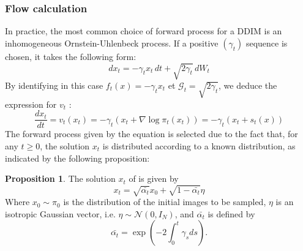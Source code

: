 \documentclass[a4paper,10pt]{article}
\theoremstyle{definition} %
\theoremstyle{definition} %
\newtheorem{proposition}[definition]{Proposition}
\theoremstyle{definition} %
\theoremstyle{definition} %
\newcommand{\0}{\boldsymbol{0}}
\begin{document}
\subsubsection{Flow calculation}\label{sec:calcul_numerique}
In practice, the most common choice of forward process for a DDIM is an inhomogeneous Ornstein-Uhlenbeck process. If a positive $(\gamma_t)$ sequence is chosen, it takes the following form:
\begin{equation}\label{eq:OU}
    dx_t = -\gamma_tx_t \,dt + \sqrt{2\gamma_t}\,dW_t
\end{equation}
By identifying in this case $f_t(x) = -\gamma_tx_t$ et $ \mathcal{G}_t = \sqrt{2\gamma_t}$, we deduce the expression for $v_t$ :
\begin{equation}\label{eq:backward}
    \frac{dx_t}{dt} = v_t(x_t) = -\gamma_t(x_t+\nabla \log \pi_t(x_t)) = -\gamma_t(x_t+s_t(x))
\end{equation}
The forward process given by the equation  is selected due to the fact that, for any $t \geq 0$, the solution $x_t$ is distributed according to a known distribution, as indicated by the following proposition:
\begin{proposition}\label{prop:solution_processus_direct}
    The solution $x_t$ of  is given by
    \begin{equation}\label{eq:solforphi}
        x_t = \sqrt{\bar{\alpha_t}}x_0 + \sqrt{1-\bar{\alpha_t}}\eta
    \end{equation}
    Where $x_0 \sim \pi_0$ is the distribution of the initial images to be sampled, $\eta$ is an isotropic Gaussian vector, i.e. $\eta \sim \mathcal{N}(0, I_N)$, and $\bar{\alpha_t}$ is defined by 
    \[\bar{\alpha_t} = \exp{\left(-2\int_0^t \gamma_s ds\right)}.\]    
\end{proposition}
\end{document}
